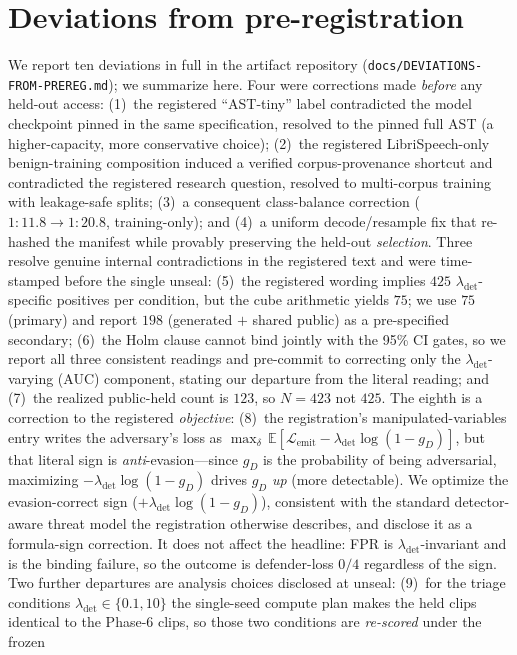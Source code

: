 \documentclass[letterpaper,twocolumn,10pt]{article}
\newcommand{\lam}{\lambda_{\mathrm{det}}}
\newcommand{\gd}{g_{D}}
\begin{document}
\section{Deviations from pre-registration}
\label{sec:deviations}
We report ten deviations in full in the artifact repository
(\texttt{docs/DEVIATIONS-FROM-PREREG.md}); we summarize here. Four were
corrections made \emph{before} any held-out access: (1)~the registered
``AST-tiny'' label contradicted the model checkpoint pinned in the same
specification, resolved to the pinned full AST (a higher-capacity, more conservative
choice); (2)~the registered LibriSpeech-only benign-training composition induced a
verified corpus-provenance shortcut and contradicted the registered research
question, resolved to multi-corpus training with leakage-safe splits;
(3)~a consequent class-balance correction ($1{:}11.8 \to 1{:}20.8$, training-only);
and (4)~a uniform decode/resample fix that re-hashed the manifest while provably
preserving the held-out \emph{selection}. Three resolve genuine internal
contradictions in the registered text and were time-stamped before the single
unseal: (5)~the registered wording implies $425$ $\lam$-specific positives per
condition, but the cube arithmetic yields $75$; we use $75$ (primary) and report
$198$ (generated $+$ shared public) as a pre-specified secondary; (6)~the Holm
clause cannot bind jointly with the 95\% CI gates, so we report all three
consistent readings and pre-commit to correcting only the $\lam$-varying (AUC)
component, stating our departure from the literal reading; and (7)~the realized
public-held count is $123$, so $N=423$ not $425$. The eighth is a correction to the
registered \emph{objective}: (8)~the registration's manipulated-variables entry writes the
adversary's loss as $\max_\delta\, \mathbb{E}[\mathcal{L}_{\mathrm{emit}} -
\lam\log(1-\gd)]$, but that literal sign is \emph{anti}-evasion---since $\gd$ is the
probability of being adversarial, maximizing $-\lam\log(1-\gd)$ drives $\gd$
\emph{up} (more detectable). We optimize the evasion-correct sign
($+\lam\log(1-\gd)$), consistent with the standard detector-aware threat model the
registration otherwise describes, and disclose it as a formula-sign correction. It
does not affect the headline: FPR is $\lam$-invariant and is the binding failure, so
the outcome is defender-loss $0/4$ regardless of the sign. Two further departures
are analysis choices disclosed at unseal: (9)~for the triage conditions
$\lam\in\{0.1,10\}$ the single-seed compute plan makes the held clips identical to
the Phase-6 clips, so those two conditions are \emph{re-scored} under the frozen
\end{document}
